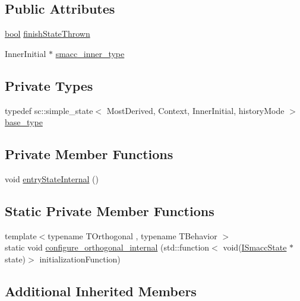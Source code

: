 \subsection*{Public Attributes}
\begin{DoxyCompactItemize}
\item 
\hyperlink{classbool}{bool} \hyperlink{classsmacc_1_1SmaccState_a6c40f733c35ddfb9ae2a2f8e9bab07d3}{finish\+State\+Thrown}
\item 
Inner\+Initial $\ast$ \hyperlink{classsmacc_1_1SmaccState_a087d0f66729b98614feb8c59ea548af1}{smacc\+\_\+inner\+\_\+type}
\end{DoxyCompactItemize}
\subsection*{Private Types}
\begin{DoxyCompactItemize}
\item 
typedef sc\+::simple\+\_\+state$<$ Most\+Derived, Context, Inner\+Initial, history\+Mode $>$ \hyperlink{classsmacc_1_1SmaccState_a68f547c6fe147554bbe607b6fcd8e40a}{base\+\_\+type}
\end{DoxyCompactItemize}
\subsection*{Private Member Functions}
\begin{DoxyCompactItemize}
\item 
void \hyperlink{classsmacc_1_1SmaccState_a084b95d0cb856d048fdb5ce81400eec7}{entry\+State\+Internal} ()
\end{DoxyCompactItemize}
\subsection*{Static Private Member Functions}
\begin{DoxyCompactItemize}
\item 
{\footnotesize template$<$typename T\+Orthogonal , typename T\+Behavior $>$ }\\static void \hyperlink{classsmacc_1_1SmaccState_a1656e6a5fd9ec036267a740a00260bf3}{configure\+\_\+orthogonal\+\_\+internal} (std\+::function$<$ void(\hyperlink{classsmacc_1_1ISmaccState}{I\+Smacc\+State} $\ast$state)$>$ initialization\+Function)
\end{DoxyCompactItemize}
\subsection*{Additional Inherited Members}


